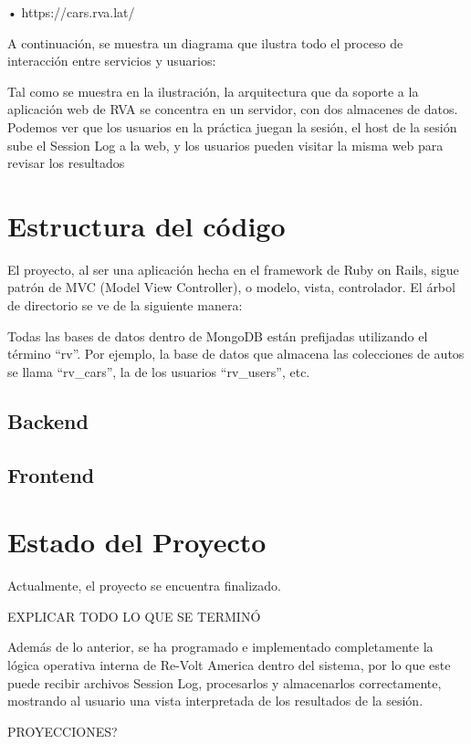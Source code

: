 •	https://cars.rva.lat/

A continuación, se muestra un diagrama que ilustra todo el proceso de interacción entre servicios y usuarios:


Tal como se muestra en la ilustración, la arquitectura que da soporte a la aplicación web de RVA se concentra en un servidor, con dos almacenes de datos. Podemos ver que los usuarios en la práctica juegan la sesión, el host de la sesión sube el Session Log a la web, y los usuarios pueden visitar la misma web para revisar los resultados

\section{Estructura del código}
El proyecto, al ser una aplicación hecha en el framework de Ruby on Rails, sigue patrón de MVC (Model View Controller), o modelo, vista, controlador. El árbol de directorio se ve de la siguiente manera:


Todas las bases de datos dentro de MongoDB están prefijadas utilizando el término “rv”. Por ejemplo, la base de datos que almacena las colecciones de autos se llama “rv\_cars”, la de los usuarios “rv\_users”, etc.

\subsection{Backend}


\subsection{Frontend}


\section{Estado del Proyecto}
Actualmente, el proyecto se encuentra finalizado.

EXPLICAR TODO LO QUE SE TERMINÓ

Además de lo anterior, se ha programado e implementado completamente la lógica operativa interna de Re-Volt America dentro del sistema, por lo que este puede recibir archivos Session Log, procesarlos y almacenarlos correctamente, mostrando al usuario una vista interpretada de los resultados de la sesión.

PROYECCIONES?



